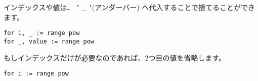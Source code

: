 インデックスや値は、 " \_ "(アンダーバー) へ代入することで捨てることができます。

\begin{lstlisting}[numbers=none]
for i, _ := range pow
for _, value := range pow
\end{lstlisting}

もしインデックスだけが必要なのであれば、2つ目の値を省略します。

\begin{lstlisting}[numbers=none]
for i := range pow
\end{lstlisting}